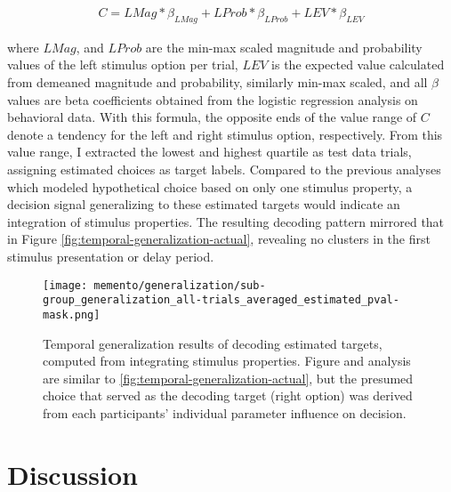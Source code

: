 \begin{equation}
	\begin{aligned}
		C = LMag * \beta_{LMag} + LProb * \beta_{LProb} + LEV * \beta_{LEV}
	\end{aligned}
\end{equation}

where $LMag$, and $LProb$ are the min-max scaled magnitude and probability values of the left stimulus option per trial, $LEV$ is the expected value calculated from demeaned magnitude and probability, similarly min-max scaled, and all $\beta$ values are beta coefficients obtained from the logistic regression analysis on behavioral data.
With this formula, the opposite ends of the value range of $C$ denote a tendency for the left and right stimulus option, respectively.
From this value range, I extracted the lowest and highest quartile as test data trials, assigning estimated choices as target labels.
Compared to the previous analyses which modeled hypothetical choice based on only one stimulus property, a decision signal generalizing to these estimated targets would indicate an integration of stimulus properties.
The resulting decoding pattern mirrored that in Figure \ref{fig:temporal-generalization-actual}, revealing no clusters in the first stimulus presentation or delay period.



\begin{figure}[H]
	\centering
	\texttt{[image: memento/generalization/sub-group\_generalization\_all-trials\_averaged\_estimated\_pval-mask.png]}
	\caption[Temporal generalization: Estimated choice]{Temporal generalization results of decoding estimated targets, computed from integrating stimulus properties. Figure and analysis are similar to \ref{fig:temporal-generalization-actual}, but the presumed choice that served as the decoding target (right option) was derived from each participants' individual parameter influence on decision.}
	\label{fig:temporal-generalization-estimated}
\end{figure}

\section{Discussion}

